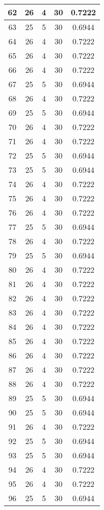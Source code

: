 \documentclass[letterpaper, 12pt]{article}
\begin{document}
\begin{longtable}{|c|c|c|c|c|}
\hline
62 & 26 & 4 & 30 & 0.7222 \\
\hline
63 & 25 & 5 & 30 & 0.6944 \\
\hline
64 & 26 & 4 & 30 & 0.7222 \\
\hline
65 & 26 & 4 & 30 & 0.7222 \\
\hline
66 & 26 & 4 & 30 & 0.7222 \\
\hline
67 & 25 & 5 & 30 & 0.6944 \\
\hline
68 & 26 & 4 & 30 & 0.7222 \\
\hline
69 & 25 & 5 & 30 & 0.6944 \\
\hline
70 & 26 & 4 & 30 & 0.7222 \\
\hline
71 & 26 & 4 & 30 & 0.7222 \\
\hline
72 & 25 & 5 & 30 & 0.6944 \\
\hline
73 & 25 & 5 & 30 & 0.6944 \\
\hline
74 & 26 & 4 & 30 & 0.7222 \\
\hline
75 & 26 & 4 & 30 & 0.7222 \\
\hline
76 & 26 & 4 & 30 & 0.7222 \\
\hline
77 & 25 & 5 & 30 & 0.6944 \\
\hline
78 & 26 & 4 & 30 & 0.7222 \\
\hline
79 & 25 & 5 & 30 & 0.6944 \\
\hline
80 & 26 & 4 & 30 & 0.7222 \\
\hline
81 & 26 & 4 & 30 & 0.7222 \\
\hline
82 & 26 & 4 & 30 & 0.7222 \\
\hline
83 & 26 & 4 & 30 & 0.7222 \\
\hline
84 & 26 & 4 & 30 & 0.7222 \\
\hline
85 & 26 & 4 & 30 & 0.7222 \\
\hline
86 & 26 & 4 & 30 & 0.7222 \\
\hline
87 & 26 & 4 & 30 & 0.7222 \\
\hline
88 & 26 & 4 & 30 & 0.7222 \\
\hline
89 & 25 & 5 & 30 & 0.6944 \\
\hline
90 & 25 & 5 & 30 & 0.6944 \\
\hline
91 & 26 & 4 & 30 & 0.7222 \\
\hline
92 & 25 & 5 & 30 & 0.6944 \\
\hline
93 & 25 & 5 & 30 & 0.6944 \\
\hline
94 & 26 & 4 & 30 & 0.7222 \\
\hline
95 & 26 & 4 & 30 & 0.7222 \\
\hline
96 & 25 & 5 & 30 & 0.6944 \\

\end{longtable}
\end{document}
